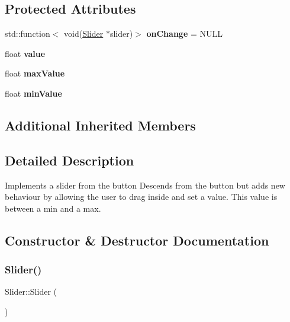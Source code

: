 \subsection*{Protected Attributes}
\begin{DoxyCompactItemize}
\item 
\mbox{\label{class_slider_a7e5f83db85bbc87857556df45074219c}} 
std\+::function$<$ void(\hyperlink{class_slider}{Slider} $\ast$slider)$>$ {\bfseries on\+Change} = N\+U\+LL
\item 
\mbox{\label{class_slider_ae7a169abde25f6d0c42837b1b201f11a}} 
float {\bfseries value}
\item 
\mbox{\label{class_slider_aa9c9f7db3c8cbe8da5a7482b3b33dc24}} 
float {\bfseries max\+Value}
\item 
\mbox{\label{class_slider_a7addbc31c8368ffd3722d3fb11abeb4d}} 
float {\bfseries min\+Value}
\end{DoxyCompactItemize}
\subsection*{Additional Inherited Members}


\subsection{Detailed Description}
Implements a slider from the button  Descends from the button but adds new behaviour by allowing the user to drag inside and set a value. This value is between a min and a max. 

\subsection{Constructor \& Destructor Documentation}
\mbox{\label{class_slider_a535033fada8e25ef7291d2a52e6e437b}} 
\subsubsection{\texorpdfstring{Slider()}{Slider()}}
{\footnotesize\ttfamily Slider\+::\+Slider (\begin{DoxyParamCaption}{ }\end{DoxyParamCaption})}

